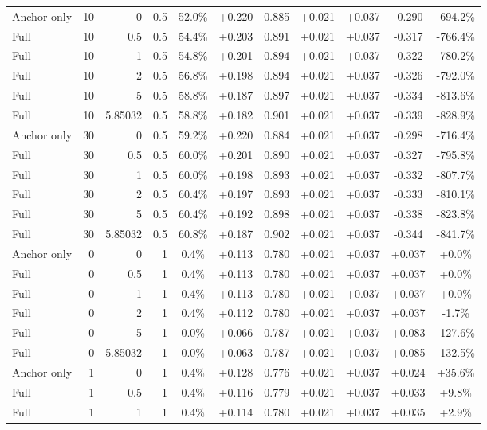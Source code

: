 \begin{table}[htbp]
\begin{tabular}{lrrrccccccc}
Anchor only & 10 & 0 & 0.5 & 52.0\% & +0.220 & 0.885 & +0.021 & +0.037 & -0.290 & -694.2\% \\
Full & 10 & 0.5 & 0.5 & 54.4\% & +0.203 & 0.891 & +0.021 & +0.037 & -0.317 & -766.4\% \\
Full & 10 & 1 & 0.5 & 54.8\% & +0.201 & 0.894 & +0.021 & +0.037 & -0.322 & -780.2\% \\
Full & 10 & 2 & 0.5 & 56.8\% & +0.198 & 0.894 & +0.021 & +0.037 & -0.326 & -792.0\% \\
Full & 10 & 5 & 0.5 & 58.8\% & +0.187 & 0.897 & +0.021 & +0.037 & -0.334 & -813.6\% \\
Full & 10 & 5.85032 & 0.5 & 58.8\% & +0.182 & 0.901 & +0.021 & +0.037 & -0.339 & -828.9\% \\
Anchor only & 30 & 0 & 0.5 & 59.2\% & +0.220 & 0.884 & +0.021 & +0.037 & -0.298 & -716.4\% \\
Full & 30 & 0.5 & 0.5 & 60.0\% & +0.201 & 0.890 & +0.021 & +0.037 & -0.327 & -795.8\% \\
Full & 30 & 1 & 0.5 & 60.0\% & +0.198 & 0.893 & +0.021 & +0.037 & -0.332 & -807.7\% \\
Full & 30 & 2 & 0.5 & 60.4\% & +0.197 & 0.893 & +0.021 & +0.037 & -0.333 & -810.1\% \\
Full & 30 & 5 & 0.5 & 60.4\% & +0.192 & 0.898 & +0.021 & +0.037 & -0.338 & -823.8\% \\
Full & 30 & 5.85032 & 0.5 & 60.8\% & +0.187 & 0.902 & +0.021 & +0.037 & -0.344 & -841.7\% \\
Anchor only & 0 & 0 & 1 & 0.4\% & +0.113 & 0.780 & +0.021 & +0.037 & +0.037 & +0.0\% \\
Full & 0 & 0.5 & 1 & 0.4\% & +0.113 & 0.780 & +0.021 & +0.037 & +0.037 & +0.0\% \\
Full & 0 & 1 & 1 & 0.4\% & +0.113 & 0.780 & +0.021 & +0.037 & +0.037 & +0.0\% \\
Full & 0 & 2 & 1 & 0.4\% & +0.112 & 0.780 & +0.021 & +0.037 & +0.037 & -1.7\% \\
Full & 0 & 5 & 1 & 0.0\% & +0.066 & 0.787 & +0.021 & +0.037 & +0.083 & -127.6\% \\
Full & 0 & 5.85032 & 1 & 0.0\% & +0.063 & 0.787 & +0.021 & +0.037 & +0.085 & -132.5\% \\
Anchor only & 1 & 0 & 1 & 0.4\% & +0.128 & 0.776 & +0.021 & +0.037 & +0.024 & +35.6\% \\
Full & 1 & 0.5 & 1 & 0.4\% & +0.116 & 0.779 & +0.021 & +0.037 & +0.033 & +9.8\% \\
Full & 1 & 1 & 1 & 0.4\% & +0.114 & 0.780 & +0.021 & +0.037 & +0.035 & +2.9\% \\

\end{tabular}
\end{table}
